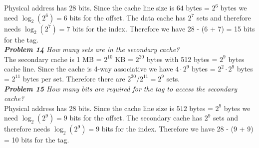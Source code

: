 \documentclass[12pt]{article}
\theoremstyle{remark}
\begin{document}
Physical address has 28 bits. Since the cache line size is $64$ bytes = $2^6$ bytes we need $\log_2(2^6) = 6$ bits for the offset. The data cache has $2^7$ sets and therefore needs $\log_2(2^7) = 7$ bits for the index. Therefore we have 28 - (6 + 7) = 15 bits for the tag. \\

\textit{\textbf{Problem 14} How many sets are in the secondary cache?} \\

The secondary cache is 1 MB = $2^{10}$ KB = $2^{20}$ bytes with 512 bytes = $2^9$ bytes cache line. Since the cache is 4-way associative we have $4 \cdot 2^9$ bytes = $2^2 \cdot 2^9$ bytes = $2^{11}$ bytes per set. Therefore there are $2^{20}/2^{11} = 2^9$ sets. \\

\textit{\textbf{Problem 15} How many bits are required for the tag to access the secondary cache?} \\

Physical address has 28 bits. Since the cache line size is $512$ bytes = $2^9$ bytes we need $\log_2(2^9) = 9$ bits for the offset. The secondary cache has $2^9$ sets and therefore needs $\log_2(2^9) = 9$ bits for the index. Therefore we have 28 - (9 + 9) = 10 bits for the tag.
\end{document}
